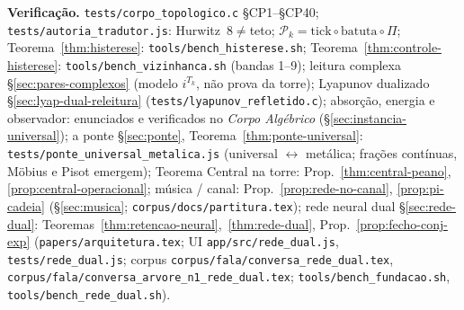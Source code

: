 \documentclass[11pt,a4paper]{article}
\newcommand{\code}[1]{\texttt{#1}}
\begin{document}
\bigskip
\noindent\textbf{Verificação.} \code{tests/corpo\_topologico.c} §CP1--§CP40;
\code{tests/autoria\_tradutor.js}: Hurwitz~$8\neq$teto;
$\mathcal{P}_k=\mathrm{tick}\circ\mathrm{batuta}\circ\Pi$;
Teorema~\ref{thm:histerese}: \code{tools/bench\_histerese.sh};
Teorema~\ref{thm:controle-histerese}: \code{tools/bench\_vizinhanca.sh}
(bandas 1--9);
leitura complexa \S\ref{sec:pares-complexos} (modelo $i^{T_k}$,
não prova da torre);
Lyapunov dualizado \S\ref{sec:lyap-dual-releitura}
(\code{tests/lyapunov\_refletido.c});
absorção, energia e observador: enunciados e verificados no
\emph{Corpo Algébrico} (\S\ref{sec:instancia-universal});
a ponte \S\ref{sec:ponte}, Teorema~\ref{thm:ponte-universal}:
\code{tests/ponte\_universal\_metalica.js} (universal $\leftrightarrow$
metálica; frações contínuas, Möbius e Pisot emergem);
Teorema Central na torre: Prop.~\ref{thm:central-peano},
\ref{prop:central-operacional};
música / canal: Prop.~\ref{prop:rede-no-canal},
\ref{prop:pi-cadeia}
(\S\ref{sec:musica}; \code{corpus/docs/partitura.tex});
rede neural dual \S\ref{sec:rede-dual}:
Teoremas~\ref{thm:retencao-neural},~\ref{thm:rede-dual},
Prop.~\ref{prop:fecho-conj-exp}
(\code{papers/arquitetura.tex}; UI \code{app/src/rede\_dual.js},
\code{tests/rede\_dual.js};
corpus \code{corpus/fala/conversa\_rede\_dual.tex},
\code{corpus/fala/conversa\_arvore\_n1\_rede\_dual.tex};
\code{tools/bench\_fundacao.sh},
\code{tools/bench\_rede\_dual.sh}).
\end{document}
